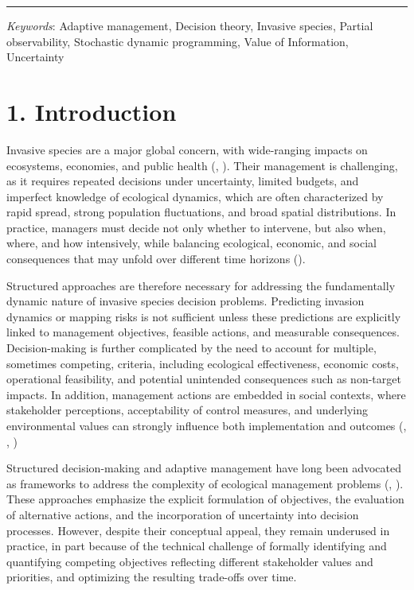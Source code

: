 \documentclass[
  11pt,
  a4paper,
]{article}
\begin{document}
\vspace{3mm}
\hrule
\vspace{5mm}

\emph{Keywords}: Adaptive management, Decision theory, Invasive species, Partial observability, Stochastic dynamic programming, Value of Information, Uncertainty

\newpage

\section{1. Introduction}\label{introduction}

Invasive species are a major global concern, with wide-ranging impacts on ecosystems, economies, and public health (, ). Their management is challenging, as it requires repeated decisions under uncertainty, limited budgets, and imperfect knowledge of ecological dynamics, which are often characterized by rapid spread, strong population fluctuations, and broad spatial distributions. In practice, managers must decide not only whether to intervene, but also when, where, and how intensively, while balancing ecological, economic, and social consequences that may unfold over different time horizons ().

Structured approaches are therefore necessary for addressing the fundamentally dynamic nature of invasive species decision problems. Predicting invasion dynamics or mapping risks is not sufficient unless these predictions are explicitly linked to management objectives, feasible actions, and measurable consequences. Decision-making is further complicated by the need to account for multiple, sometimes competing, criteria, including ecological effectiveness, economic costs, operational feasibility, and potential unintended consequences such as non-target impacts. In addition, management actions are embedded in social contexts, where stakeholder perceptions, acceptability of control measures, and underlying environmental values can strongly influence both implementation and outcomes (, , )

Structured decision-making and adaptive management have long been advocated as frameworks to address the complexity of ecological management problems (, ). These approaches emphasize the explicit formulation of objectives, the evaluation of alternative actions, and the incorporation of uncertainty into decision processes. However, despite their conceptual appeal, they remain underused in practice, in part because of the technical challenge of formally identifying and quantifying competing objectives reflecting different stakeholder values and priorities, and optimizing the resulting trade-offs over time.
\end{document}

